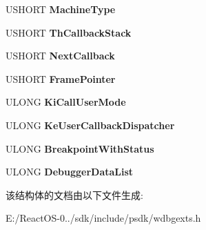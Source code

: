 \begin{DoxyCompactItemize}
U\+S\+H\+O\+RT {\bfseries Machine\+Type}
\item 
\mbox{\label{struct___d_b_g_k_d___g_e_t___v_e_r_s_i_o_n32_a5a10a52fcd0879e7e65b98384037ab48}} 
U\+S\+H\+O\+RT {\bfseries Th\+Callback\+Stack}
\item 
\mbox{\label{struct___d_b_g_k_d___g_e_t___v_e_r_s_i_o_n32_a456b6b1b2a6e1b9f9519a9edb6c55c6d}} 
U\+S\+H\+O\+RT {\bfseries Next\+Callback}
\item 
\mbox{\label{struct___d_b_g_k_d___g_e_t___v_e_r_s_i_o_n32_a389f98f4911046872ed21272b4706c19}} 
U\+S\+H\+O\+RT {\bfseries Frame\+Pointer}
\item 
\mbox{\label{struct___d_b_g_k_d___g_e_t___v_e_r_s_i_o_n32_ad114f9790d915e1069367c3ef7d07b5f}} 
U\+L\+O\+NG {\bfseries Ki\+Call\+User\+Mode}
\item 
\mbox{\label{struct___d_b_g_k_d___g_e_t___v_e_r_s_i_o_n32_a528f4cae0a67fe5f3ceb0be20dc0bc69}} 
U\+L\+O\+NG {\bfseries Ke\+User\+Callback\+Dispatcher}
\item 
\mbox{\label{struct___d_b_g_k_d___g_e_t___v_e_r_s_i_o_n32_aa313825bd076b834b20d44584e46d00e}} 
U\+L\+O\+NG {\bfseries Breakpoint\+With\+Status}
\item 
\mbox{\label{struct___d_b_g_k_d___g_e_t___v_e_r_s_i_o_n32_a25edda66e1c5c66ab36db82a80aed8dc}} 
U\+L\+O\+NG {\bfseries Debugger\+Data\+List}
\end{DoxyCompactItemize}


该结构体的文档由以下文件生成\+:\begin{DoxyCompactItemize}
\item 
E\+:/\+React\+O\+S-\/0../sdk/include/psdk/wdbgexts.\+h\end{DoxyCompactItemize}
